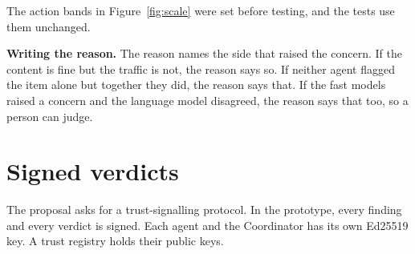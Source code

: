 \documentclass[11pt,a4paper]{article}
\newenvironment{fig}[2]{\par\medskip\noindent\begin{minipage}{\linewidth}\centering
  \refstepcounter{figure}\label{#2}\def\figtext{#1}}
  {\par\vspace{5pt}{\small Figure~\thefigure: \figtext\par}\end{minipage}\par\medskip}
\begin{document}
\begin{fig}{What the Coordinator does for each item.}{fig:coord}
\end{fig}

The action bands in Figure~\ref{fig:scale} were set before testing, and the tests use them unchanged.

\textbf{Writing the reason.} The reason names the side that raised the concern. If the content is fine but the traffic is not, the reason says so. If neither agent flagged the item alone but together they did, the reason says that. If the fast models raised a concern and the language model disagreed, the reason says that too, so a person can judge.

\section{Signed verdicts}

The proposal asks for a trust-signalling protocol. In the prototype, every finding and every verdict is signed. Each agent and the Coordinator has its own Ed25519 key. A trust registry holds their public keys.
\end{document}
